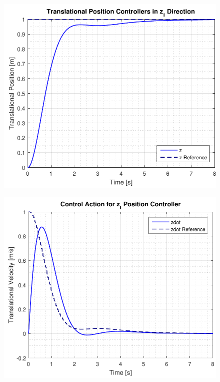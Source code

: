 \begin{minipage}{\linewidth}
    \begin{minipage}{0.45\linewidth}
        \begin{figure}[H]
           \vspace{-.5cm}
            \includegraphics[scale=.55]{figures/positionControllerZ}
            \centering			
            \label{fig:positionControllersZ}
        \end{figure}
    \end{minipage}
    \hspace{0.03\linewidth}
    \begin{minipage}{0.45\linewidth}
        \begin{figure}[H]
            \includegraphics[scale=.55]{figures/positionControllerZAction}

\end{figure}
\end{minipage}
\end{minipage}
